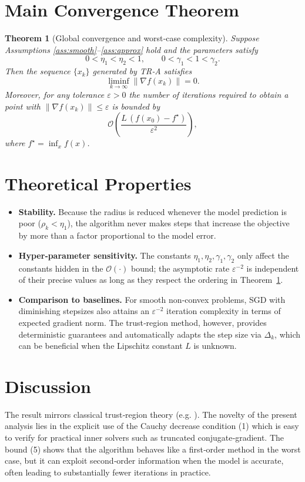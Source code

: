 \documentclass{article}
\newtheorem{theorem}{Theorem}
\begin{document}
\section*{Main Convergence Theorem}
\begin{theorem}[Global convergence and worst‑case complexity]\label{thm:main}
Suppose Assumptions \ref{ass:smooth}--\ref{ass:approx} hold and the
parameters satisfy
\[
0<\eta_{1}<\eta_{2}<1,\qquad 0<\gamma_{1}<1<\gamma_{2}.
\]
Then the sequence \(\{x_{k}\}\) generated by TR‑A satisfies
\[
\liminf_{k\to\infty}\|\nabla f(x_{k})\|=0.
\]
Moreover, for any tolerance \(\varepsilon>0\) the number of iterations
required to obtain a point with \(\|\nabla f(x_{k})\|\le\varepsilon\) is bounded by
\[
\mathcal{O}\!\left(\frac{L\, (f(x_{0})-f^{\star})}{\varepsilon^{2}}\right),
\tag{5}
\]
where \(f^{\star}=\inf_{x}f(x)\).
\end{theorem}

\section*{Theoretical Properties}
\begin{itemize}[leftmargin=*]
\item \textbf{Stability.}  Because the radius is reduced whenever the model
prediction is poor (\(\rho_{k}<\eta_{1}\)), the algorithm never makes steps that
increase the objective by more than a factor proportional to the model error.
\item \textbf{Hyper‑parameter sensitivity.}
  The constants \(\eta_{1},\eta_{2},\gamma_{1},\gamma_{2}\) only affect the
  constants hidden in the \(\mathcal{O}(\cdot)\) bound; the asymptotic rate
  \(\varepsilon^{-2}\) is independent of their precise values as long as they
  respect the ordering in Theorem~\ref{thm:main}.
\item \textbf{Comparison to baselines.}
  For smooth non‑convex problems, SGD with diminishing stepsizes also attains an
  \(\varepsilon^{-2}\) iteration complexity in terms of expected gradient norm.
  The trust‑region method, however, provides deterministic guarantees and
  automatically adapts the step size via \(\Delta_{k}\), which can be beneficial
  when the Lipschitz constant \(L\) is unknown.
\end{itemize}

\section*{Discussion}
The result mirrors classical trust‑region theory (e.g. \cite{conn1999}).  The
novelty of the present analysis lies in the explicit use of the Cauchy
decrease condition (1) which is easy to verify for practical inner solvers
such as truncated conjugate‑gradient.  The bound (5) shows that the algorithm
behaves like a first‑order method in the worst case, but it can exploit
second‑order information when the model is accurate, often leading to
substantially fewer iterations in practice.
\end{document}
